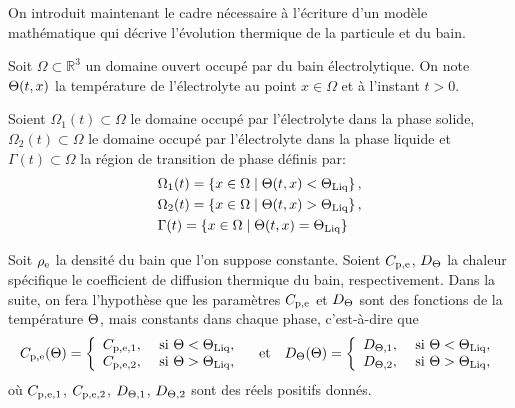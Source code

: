On introduit maintenant le cadre nécessaire à l'écriture d'un modèle
mathématique qui décrive l'évolution thermique de la particule et du
bain.

Soit $\Omega\subset \mathbb R^3$ un domaine ouvert occupé par du bain
électrolytique. On note $\Theta(t, x)$ la température de
l'électrolyte au point $x \in \Omega$ et à l'instant $t > 0$.

Soient $\Omega_1(t)\subset \Omega$ le domaine occupé par l'électrolyte
dans la phase solide, $\Omega_2(t)\subset \Omega$ le domaine occupé
par l'électrolyte dans la phase liquide et $\Gamma(t) \subset \Omega$
la région de transition de phase définis par:
\begin{align}\label{eq:phase-domains}
  &\Omega_1(t) = \cparent{x\in\Omega \mid %
                         \temperature(t, x) < \tliq},\\
  &\Omega_2(t) = \cparent{x\in\Omega \mid \temperature(t, x) %
    > \tliq},\\
  &\Gamma(t) = \cparent{x\in\Omega\mid \temperature(t, x) = \tliq}
\end{align}

Soit $\rho_\mathrm{e}$ la densité du bain que l'on suppose
constante. Soient $C_{\mathrm{p,e}}$, $D_\Theta$ la chaleur
spécifique le coefficient de diffusion thermique du bain,
respectivement. Dans la suite, on fera l'hypothèse que les paramètres
$C_{\mathrm{p,e}}$ et $D_\Theta$ sont des fonctions de la
température $\Theta$, mais constants dans chaque phase,
c'est-à-dire que
\begin{equation}
  C_{\mathrm{p,e}}(\Theta) = \left\{
  \begin{array}{ll}
    C_{\mathrm{p,e,1}}, & \text{ si } \Theta < \Theta_\text{Liq},\\
    C_{\mathrm{p,e,2}}, & \text{ si } \Theta > \Theta_\text{Liq},
  \end{array}
  \right.
  \quad\text{et}\quad
  D_\Theta(\Theta) = \left\{
  \begin{array}{ll}
    D_{\Theta,\mathrm{1}}, & \text{ si } \Theta < \Theta_\text{Liq},\\
    D_{\Theta,\mathrm{2}}, & \text{ si } \Theta > \Theta_\text{Liq},
  \end{array}
  \right.
\end{equation}
où $C_{\mathrm{p,e,1}}$, $C_{\mathrm{p,e,2}}$, $D_{\Theta,\mathrm{1}}$,
$D_{\Theta,\mathrm{2}}$ sont des réels positifs donnés.

